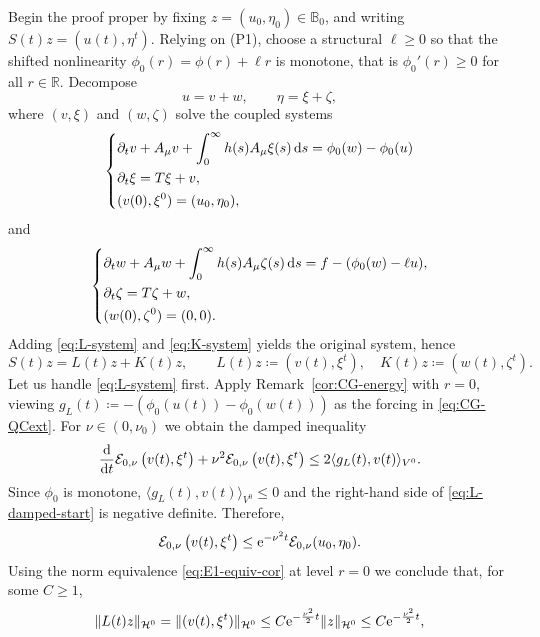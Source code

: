 \documentclass[12pt,leqno]{amsart}
\def\e{{\rm e}}
\def\d{{\rm d}}
\theoremstyle{definition}
\numberwithin{equation}{section}
\numberwithin{figure}{section}
\begin{document}
Begin the proof proper by
fixing $z=(u_0,\eta_0)\in\mathbb B_0$, and writing $S(t)z=(u(t),\eta^t)$.
Relying on (P1), choose a structural $\ell\ge 0$ so that the shifted nonlinearity $\phi_0(r)=\phi(r)+\ell r$ is monotone, that is
$\phi_0'(r)\ge 0$ for all $r\in\mathbb R$.
Decompose
\[
u=v+w,\qquad \eta=\xi+\zeta,
\]
where $(v,\xi)$ and $(w,\zeta)$ solve the coupled systems
\begin{equation}\label{eq:L-system}
\left\{
\begin{aligned}
&\partial_t v + A_\mu v + \int_0^\infty h(s)A_\mu\xi(s)\, \d s   =\phi_0(w)-\phi_0(u) \\
&\partial_t \xi = T\xi + v,\\
&(v(0),\xi^0)=(u_0,\eta_0),
\end{aligned}
\right.
\end{equation}
and
\begin{equation}\label{eq:K-system}
\left\{
\begin{aligned}
&\partial_t w + A_\mu w + \int_0^\infty h(s)A_\mu\zeta(s) \,\d s 
= f - (\phi_0(w)-\ell u),\\
&\partial_t \zeta = T\zeta + w,\\
&(w(0),\zeta^0)=(0,0).
\end{aligned}
\right.
\end{equation}
Adding \eqref{eq:L-system} and \eqref{eq:K-system} yields the original system, hence
\begin{equation}\label{eq:decomp}
S(t)z = L(t)z + K(t)z,\qquad L(t)z\coloneqq (v(t),\xi^t),\quad K(t)z\coloneqq(w(t),\zeta^t).
\end{equation}
Let us handle \eqref{eq:L-system} first. Apply Remark~\ref{cor:CG-energy} with $r=0$, viewing
$
g_L(t)\coloneqq -\left(\phi_0(u(t))-\phi_0(w(t))\right)
$
as the forcing in \eqref{eq:CG-QCext}. For $\nu\in(0,\nu_0)$ we obtain the damped inequality
\begin{equation}\label{eq:L-damped-start}
\frac{\d}{\d t}\mathcal E_{0,\nu}\left(v(t),\xi^t\right)+\nu^2\mathcal E_{0,\nu}\left(v(t),\xi^t\right)
\le 2\langle g_L(t),v(t)\rangle_{V^0} .
\end{equation}
Since $\phi_0$ is monotone,
  $\langle g_L(t),v(t)\rangle_{V^0}\le 0$ and the right-hand side of
\eqref{eq:L-damped-start} is negative definite. Therefore,
\[
\mathcal E_{0,\nu}\left(v(t),\xi^t\right)\le \e^{-\nu^2 t}\mathcal E_{0,\nu}(u_0,\eta_0).
\]
Using the norm equivalence \eqref{eq:E1-equiv-cor} at level $r=0$ we conclude that, for some $C\ge 1$,
\begin{equation}\label{eq:L-exp}
\|L(t)z\|_{\mathcal H^0}
=\|(v(t),\xi^t)\|_{\mathcal H^0}
\le C\e^{-\frac{\nu^2}{2}t}\|z\|_{\mathcal H^0}\leq  C\e^{-\frac{\nu^2}{2}t},
\end{equation}
\end{document}
